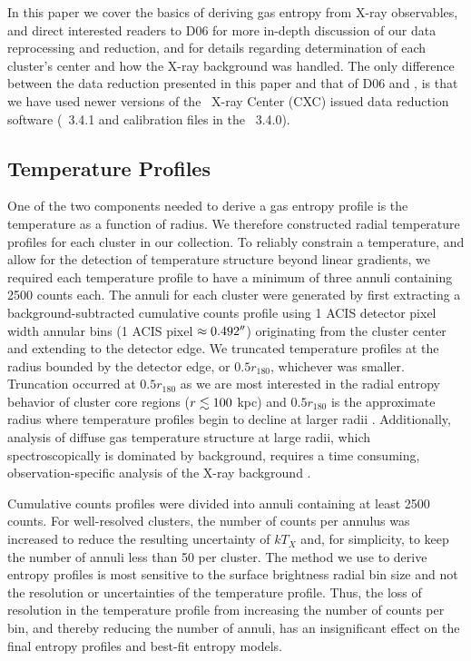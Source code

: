 \documentclass[12pt,preprint]{aastex}
\begin{document}
In this paper we cover the basics of deriving gas entropy from X-ray
observables, and direct interested readers to D06 for more in-depth
discussion of our data reprocessing and reduction, and
\citet{xrayband} for details regarding determination of each cluster's
center and how the X-ray background was handled. The only difference
between the data reduction presented in this paper and that of D06 and
\citet{xrayband}, is that we have used newer versions of the \chandra\
X-ray Center (CXC) issued data reduction software (\ciao\ 3.4.1 and
calibration files in the \caldb\ 3.4.0).

\subsection{Temperature Profiles}
\label{sec:temppr}

One of the two components needed to derive a gas entropy profile is
the temperature as a function of radius. We therefore constructed
radial temperature profiles for each cluster in our collection. To
reliably constrain a temperature, and allow for the detection of
temperature structure beyond linear gradients, we required each
temperature profile to have a minimum of three annuli containing 2500
counts each. The annuli for each cluster were generated by first
extracting a background-subtracted cumulative counts profile using 1
ACIS detector pixel width annular bins (1 ACIS pixel $\approx
0.492\mathrm{^\prime}\hskip -0.1em\mathrm{^\prime}$) originating from the cluster center and extending to the
detector edge. We truncated temperature profiles at the radius bounded
by the detector edge, or $0.5 r_{180}$, whichever was
smaller. Truncation occurred at $0.5 r_{180}$ as we are most
interested in the radial entropy behavior of cluster core regions ($r
\lesssim 100$ kpc) and $0.5 r_{180}$ is the approximate radius where
temperature profiles begin to decline at larger radii
\citep{2005ApJ...628..655V}.  Additionally, analysis of diffuse gas
temperature structure at large radii, which spectroscopically is
dominated by background, requires a time consuming,
observation-specific analysis of the X-ray background \cite[see][for a
  detailed discussion on this point]{minggroups}.

Cumulative counts profiles were divided into annuli containing at
least 2500 counts. For well-resolved clusters, the number of counts
per annulus was increased to reduce the resulting uncertainty of
$kT_X$ and, for simplicity, to keep the number of annuli less than 50
per cluster. The method we use to derive entropy profiles is most
sensitive to the surface brightness radial bin size and not the
resolution or uncertainties of the temperature profile. Thus, the loss
of resolution in the temperature profile from increasing the number of
counts per bin, and thereby reducing the number of annuli, has an
insignificant effect on the final entropy profiles and best-fit
entropy models.
\end{document}
